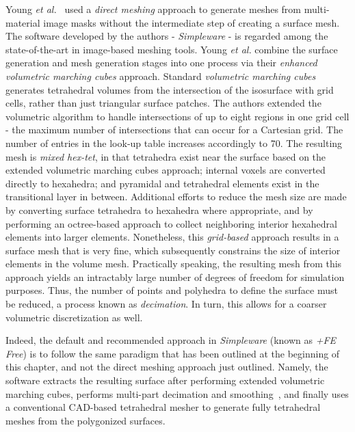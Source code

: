 Young \textit{et al.}~\cite{young_2008} used a \textit{direct meshing} approach to generate meshes from multi-material image masks without the intermediate step of creating a surface mesh. The software developed by the authors - \textit{Simpleware} - is regarded among the state-of-the-art in image-based meshing tools. Young \textit{et al.} combine the surface generation and mesh generation stages into one process via their \textit{enhanced volumetric marching cubes} approach. Standard \textit{volumetric marching cubes} generates tetrahedral volumes from the intersection of the isosurface with grid cells, rather than just triangular surface patches. The authors extended the volumetric algorithm to handle intersections of up to eight regions in one grid cell - the maximum number of intersections that can occur for a Cartesian grid. The number of entries in the look-up table increases accordingly to 70. The resulting mesh is \textit{mixed hex-tet}, in that tetrahedra exist near the surface based on the extended volumetric marching cubes approach; internal voxels are converted directly to hexahedra; and pyramidal and tetrahedral elements exist in the transitional layer in between. Additional efforts to reduce the mesh size are made by converting surface tetrahedra to hexahedra where appropriate, and by performing an octree-based approach to collect neighboring interior hexahedral elements into larger elements. Nonetheless, this \textit{grid-based} approach results in a surface mesh that is very fine, which subsequently constrains the size of interior elements in the volume mesh. Practically speaking, the resulting mesh from this approach yields an intractably large number of degrees of freedom for simulation purposes. Thus, the number of points and polyhedra to define the surface must be reduced, a process known as \textit{decimation}. In turn, this allows for a coarser volumetric discretization as well.

Indeed, the default and recommended approach in \textit{Simpleware} (known as \textit{+FE Free}) is to follow the same paradigm that has been outlined at the beginning of this chapter, and not the direct meshing approach just outlined. Namely, the software extracts the resulting surface after performing extended volumetric marching cubes, performs multi-part decimation and smoothing~\cite{egst}, and finally uses a conventional CAD-based tetrahedral mesher to generate fully tetrahedral meshes from the polygonized surfaces.

